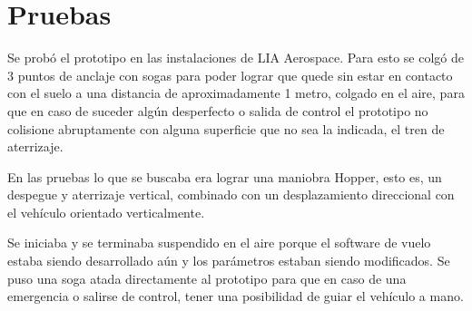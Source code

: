 \section{Pruebas}

Se probó el prototipo en las instalaciones de LIA Aerospace. Para esto se colgó de 3 puntos de anclaje con sogas para poder lograr que quede sin estar en contacto con el suelo a una distancia de aproximadamente 1 metro, colgado en el aire, para que en caso de suceder algún desperfecto o salida de control el prototipo no colisione abruptamente con alguna superficie que no sea la indicada, el tren de aterrizaje.

En las pruebas lo que se buscaba era lograr una maniobra Hopper, esto es, un despegue y aterrizaje vertical, combinado con un desplazamiento direccional con el vehículo orientado verticalmente.

Se iniciaba y se terminaba suspendido en el aire porque el software de vuelo estaba siendo desarrollado aún y los parámetros estaban siendo modificados.
Se puso una soga atada directamente al prototipo para que en caso de una emergencia o salirse de control, tener una posibilidad de guiar el vehículo a mano.
